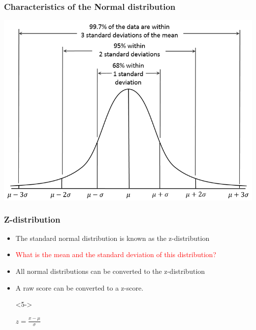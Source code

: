 \documentclass[dvipsnames]{beamer}\usepackage[]{graphicx}\usepackage[]{color}
\begin{document}
\begin{frame}
\frametitle{Characteristics of the Normal distribution}
\begin{center}
\includegraphics[scale = .5]{images/normal.png}
\end{center}
\end{frame}

\begin{frame}
\frametitle{Z-distribution}

\begin{itemize}
  \item<1-> The standard normal distribution is known as the z-distribution
  \item<2-> \textcolor{red}{What is the mean and the standard deviation of this distribution?}
  \item<3-> All normal distributions can be converted to the z-distribution
  \item<4-> A raw score can be converted to a z-score.
  \item[]<5-> \begin{center}$z = \frac{x - \mu}{\sigma}$\end{center}
\end{itemize}
\end{frame}
\end{document}
